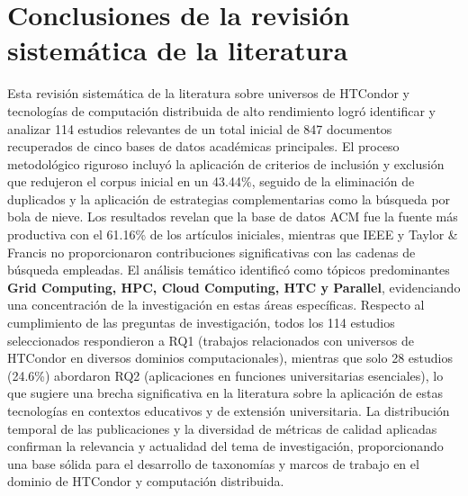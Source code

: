 \section{Conclusiones de la revisión sistemática de la literatura}
\noindent
Esta revisión sistemática de la literatura sobre universos de HTCondor y tecnologías de computación distribuida de alto rendimiento logró identificar y analizar 114 estudios relevantes de un total inicial de 847 documentos recuperados de cinco bases de datos académicas principales. El proceso metodológico riguroso incluyó la aplicación de criterios de inclusión y exclusión que redujeron el corpus inicial en un 43.44\%, seguido de la eliminación de duplicados y la aplicación de estrategias complementarias como la búsqueda por bola de nieve. Los resultados revelan que la base de datos ACM fue la fuente más productiva con el 61.16\% de los artículos iniciales, mientras que IEEE y Taylor \& Francis no proporcionaron contribuciones significativas con las cadenas de búsqueda empleadas. El análisis temático identificó como tópicos predominantes \textbf{Grid Computing, HPC, Cloud Computing, HTC y Parallel}, evidenciando una concentración de la investigación en estas áreas específicas. Respecto al cumplimiento de las preguntas de investigación, todos los 114 estudios seleccionados respondieron a RQ1 (trabajos relacionados con universos de HTCondor en diversos dominios computacionales), mientras que solo 28 estudios (24.6\%) abordaron RQ2 (aplicaciones en funciones universitarias esenciales), lo que sugiere una brecha significativa en la literatura sobre la aplicación de estas tecnologías en contextos educativos y de extensión universitaria. La distribución temporal de las publicaciones y la diversidad de métricas de calidad aplicadas confirman la relevancia y actualidad del tema de investigación, proporcionando una base sólida para el desarrollo de taxonomías y marcos de trabajo en el dominio de HTCondor y computación distribuida.
